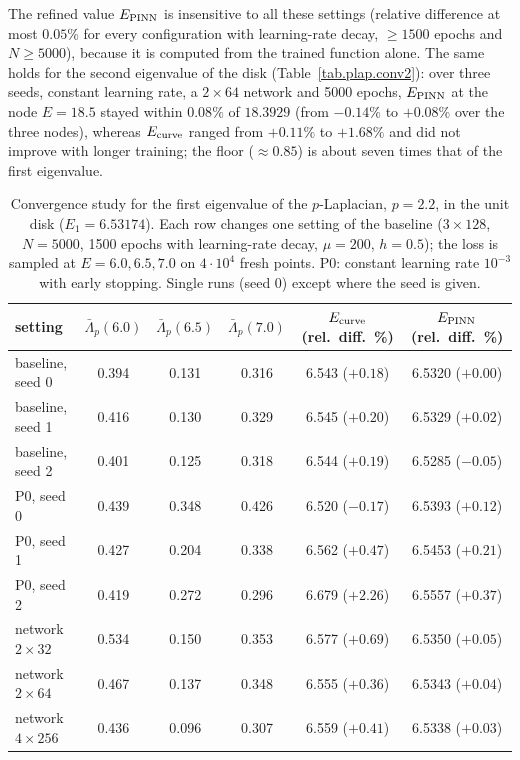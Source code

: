 \documentclass[10pt]{amsart}
\theoremstyle{definition}
\theoremstyle{remark}
\theoremstyle{plain}
\begin{document}
The refined value $E_{\rm PINN}$ is insensitive to all these settings (relative difference at most
$0.05\%$ for every configuration with learning-rate decay, $\ge1500$ epochs and $N\ge5000$), because it
is computed from the trained function alone. The same holds for the second eigenvalue of the disk
(Table~\ref{tab.plap.conv2}): over three seeds, constant learning rate, a $2\times64$ network and 5000
epochs, $E_{\rm PINN}$ at the node $E=18.5$ stayed within $0.08\%$ of $18.3929$ (from $-0.14\%$ to
$+0.08\%$ over the three nodes), whereas $E_{\rm curve}$ ranged from $+0.11\%$ to $+1.68\%$ and did not
improve with longer training; the floor ($\approx0.85$) is about seven times that of the first
eigenvalue.

\begin{table}[H]
\centering\small
\caption{Convergence study for the first eigenvalue of the $p$-Laplacian, $p=2.2$, in the unit disk ($E_1=6.53174$). Each row changes one setting of the baseline ($3\times128$, $N=5000$, 1500 epochs with learning-rate decay, $\mu=200$, $h=0.5$); the loss is sampled at $E=6.0,6.5,7.0$ on $4\cdot10^4$ fresh points. P0: constant learning rate $10^{-3}$ with early stopping. Single runs (seed 0) except where the seed is given.}
\label{tab.plap.conv}
\begin{tabular}{lccccc}
\toprule
setting & $\bar\Lambda_p(6.0)$ & $\bar\Lambda_p(6.5)$ & $\bar\Lambda_p(7.0)$ & $E_{\rm curve}$ (rel.\ diff.\ \%) & $E_{\rm PINN}$ (rel.\ diff.\ \%)\\
\midrule
baseline, seed 0 & 0.394 & 0.131 & 0.316 & 6.543 ($+0.18$) & 6.5320 ($+0.00$)\\
baseline, seed 1 & 0.416 & 0.130 & 0.329 & 6.545 ($+0.20$) & 6.5329 ($+0.02$)\\
baseline, seed 2 & 0.401 & 0.125 & 0.318 & 6.544 ($+0.19$) & 6.5285 ($-0.05$)\\
P0, seed 0 & 0.439 & 0.348 & 0.426 & 6.520 ($-0.17$) & 6.5393 ($+0.12$)\\
P0, seed 1 & 0.427 & 0.204 & 0.338 & 6.562 ($+0.47$) & 6.5453 ($+0.21$)\\
P0, seed 2 & 0.419 & 0.272 & 0.296 & 6.679 ($+2.26$) & 6.5557 ($+0.37$)\\
network $2\times32$ & 0.534 & 0.150 & 0.353 & 6.577 ($+0.69$) & 6.5350 ($+0.05$)\\
network $2\times64$ & 0.467 & 0.137 & 0.348 & 6.555 ($+0.36$) & 6.5343 ($+0.04$)\\
network $4\times256$ & 0.436 & 0.096 & 0.307 & 6.559 ($+0.41$) & 6.5338 ($+0.03$)\\

\end{tabular}
\end{table}
\end{document}
